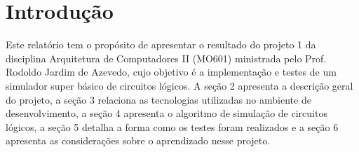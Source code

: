 \section{Introdução}

Este relatório tem o propósito de apresentar o resultado do projeto 1 da 
disciplina Arquitetura de Computadores II (MO601) \space ministrada pelo Prof. Rodoldo Jardim de Azevedo, cujo 
objetivo é a implementação e testes de um simulador super básico de circuitos lógicos. 
A seção 2 apresenta a descrição geral do projeto, a seção 3 relaciona as tecnologias utilizadas 
no ambiente de desenvolvimento, a seção 4 apresenta 
o algoritmo de simulação de circuitos lógicos, a seção 5 detalha a forma como os testes foram realizados e 
a seção 6 apresenta as considerações sobre o aprendizado nesse projeto.